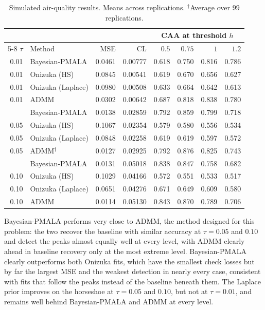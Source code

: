 \begin{table}[H]
\centering
\small
\setlength{\tabcolsep}{4pt}
\caption{Simulated air-quality results. Means across replications. $^{\dagger}$Average over $99$ replications.}
\label{tab:air_n500}
\begin{tabular}{@{}rlrrrrrr@{}}
\toprule
 & & & & \multicolumn{4}{c}{CAA at threshold $h$} \\
\cmidrule(lr){5-8}
$\tau$ & Method & MSE & CL & $0.5$ & $0.75$ & $1$ & $1.2$ \\
\midrule
0.01 & Bayesian-PMALA & 0.0461 & 0.00777 & 0.618 & 0.750 & 0.816 & 0.786 \\
0.01 & Onizuka (HS) & 0.0845 & 0.00541 & 0.619 & 0.670 & 0.656 & 0.627 \\
0.01 & Onizuka (Laplace) & 0.0980 & 0.00508 & 0.633 & 0.664 & 0.642 & 0.613 \\
0.01 & ADMM & 0.0302 & 0.00642 & 0.687 & 0.818 & 0.838 & 0.780 \\
\addlinespace[3pt]
0.05 & Bayesian-PMALA & 0.0138 & 0.02859 & 0.792 & 0.859 & 0.799 & 0.718 \\
0.05 & Onizuka (HS) & 0.1067 & 0.02354 & 0.579 & 0.580 & 0.556 & 0.534 \\
0.05 & Onizuka (Laplace) & 0.0848 & 0.02258 & 0.619 & 0.619 & 0.597 & 0.572 \\
0.05 & ADMM$^{\dagger}$ & 0.0127 & 0.02925 & 0.792 & 0.876 & 0.825 & 0.743 \\
\addlinespace[3pt]
0.10 & Bayesian-PMALA & 0.0131 & 0.05018 & 0.838 & 0.847 & 0.758 & 0.682 \\
0.10 & Onizuka (HS) & 0.1029 & 0.04166 & 0.572 & 0.551 & 0.533 & 0.517 \\
0.10 & Onizuka (Laplace) & 0.0651 & 0.04276 & 0.671 & 0.649 & 0.609 & 0.580 \\
0.10 & ADMM & 0.0114 & 0.05130 & 0.843 & 0.870 & 0.789 & 0.706 \\
\bottomrule
\end{tabular}
\end{table}

Bayesian-PMALA performs very close to ADMM, the method designed for this problem: the two recover the baseline with similar accuracy at $\tau=0.05$ and $0.10$ and detect the peaks almost equally well at every level, with ADMM clearly ahead in baseline recovery only at the most extreme level. Bayesian-PMALA clearly outperforms both Onizuka fits, which have the smallest check losses but by far the largest MSE and the weakest detection in nearly every case, consistent with fits that follow the peaks instead of the baseline beneath them. The Laplace prior improves on the horseshoe at $\tau=0.05$ and $0.10$, but not at $\tau=0.01$, and remains well behind Bayesian-PMALA and ADMM at every level.
